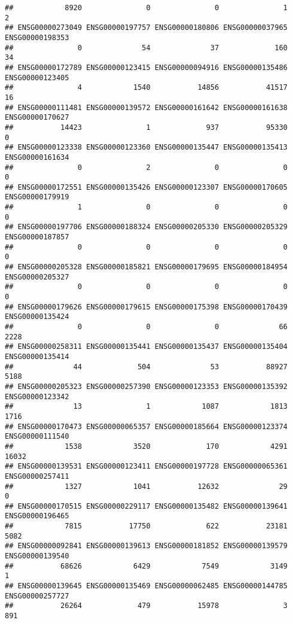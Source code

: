 \documentclass[
]{article}
\begin{document}
\begin{verbatim}
##            8920               0               0               1               2 
## ENSG00000273049 ENSG00000197757 ENSG00000180806 ENSG00000037965 ENSG00000198353 
##               0              54              37             160              34 
## ENSG00000172789 ENSG00000123415 ENSG00000094916 ENSG00000135486 ENSG00000123405 
##               4            1540           14856           41517              16 
## ENSG00000111481 ENSG00000139572 ENSG00000161642 ENSG00000161638 ENSG00000170627 
##           14423               1             937           95330               0 
## ENSG00000123338 ENSG00000123360 ENSG00000135447 ENSG00000135413 ENSG00000161634 
##               0               2               0               0               0 
## ENSG00000172551 ENSG00000135426 ENSG00000123307 ENSG00000170605 ENSG00000179919 
##               1               0               0               0               0 
## ENSG00000197706 ENSG00000188324 ENSG00000205330 ENSG00000205329 ENSG00000187857 
##               0               0               0               0               0 
## ENSG00000205328 ENSG00000185821 ENSG00000179695 ENSG00000184954 ENSG00000205327 
##               0               0               0               0               0 
## ENSG00000179626 ENSG00000179615 ENSG00000175398 ENSG00000170439 ENSG00000135424 
##               0               0               0              66            2228 
## ENSG00000258311 ENSG00000135441 ENSG00000135437 ENSG00000135404 ENSG00000135414 
##              44             504              53           88927            5188 
## ENSG00000205323 ENSG00000257390 ENSG00000123353 ENSG00000135392 ENSG00000123342 
##              13               1            1087            1813            1716 
## ENSG00000170473 ENSG00000065357 ENSG00000185664 ENSG00000123374 ENSG00000111540 
##            1538            3520             170            4291           16032 
## ENSG00000139531 ENSG00000123411 ENSG00000197728 ENSG00000065361 ENSG00000257411 
##            1327            1041           12632              29               0 
## ENSG00000170515 ENSG00000229117 ENSG00000135482 ENSG00000139641 ENSG00000196465 
##            7815           17750             622           23181            5082 
## ENSG00000092841 ENSG00000139613 ENSG00000181852 ENSG00000139579 ENSG00000139540 
##           68626            6429            7549            3149               1 
## ENSG00000139645 ENSG00000135469 ENSG00000062485 ENSG00000144785 ENSG00000257727 
##           26264             479           15978               3             891 

\end{verbatim}
\end{document}
